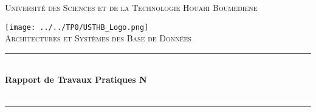 
\begin{titlepage} %
	\newcommand{\HRule}{\rule{\linewidth}{0.5mm}} %
	
	\center %
	
	
	\baselineskip 
	\textsc{\LARGE Université des Sciences et de la Technologie Houari Boumediene}%

	
	\vfill
	\texttt{[image: ../../TP0/USTHB\_Logo.png]}\\[1cm] %
	 
	
	\textsc{\Large Architectures et Systèmes des Base de Données}\\[0.5cm] %
	
	
	\HRule\\[0.4cm]
	\baselineskip 
	{\huge\bfseries Rapport de Travaux Pratiques N\textdegree  \reportnumber \\ \reporttitle}\\[0.4cm] %
	
	\HRule\\[1.5cm]
	
	

\end{titlepage}
